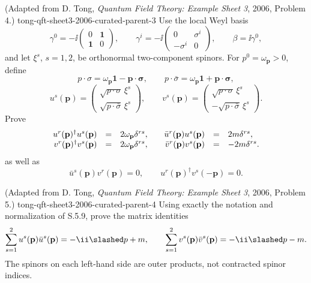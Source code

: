 \begin{enumerate}
  {(Adapted from D. Tong, \emph{Quantum Field Theory: Example Sheet 3}, 2006, Problem 4.)}
  {tong-qft-sheet3-2006-curated-parent-3}
Use the local Weyl basis
\[
 \gamma^0=-\ii\begin{pmatrix}0&\mathbf1\\ \mathbf1&0\end{pmatrix},
 \qquad
 \gamma^i=-\ii\begin{pmatrix}0&\sigma^i\\-\sigma^i&0\end{pmatrix},
 \qquad
 \beta=\ii\gamma^0,
\]
and let \(\xi^s\), \(s=1,2\), be orthonormal two-component spinors.
For \(p^0=\omega_{\mathbf p}>0\), define
\[
 p\cdot\sigma=\omega_{\mathbf p}\mathbf1-\mathbf p\cdot\boldsymbol\sigma,
 \qquad
 p\cdot\bar\sigma=\omega_{\mathbf p}\mathbf1+\mathbf p\cdot\boldsymbol\sigma,
\]
\[
 u^s(\mathbf p)=
 \begin{pmatrix}\sqrt{p\cdot\sigma}\,\xi^s\\
 \sqrt{p\cdot\bar\sigma}\,\xi^s\end{pmatrix},
 \qquad
 v^s(\mathbf p)=
 \begin{pmatrix}\sqrt{p\cdot\sigma}\,\xi^s\\
 -\sqrt{p\cdot\bar\sigma}\,\xi^s\end{pmatrix}.
\]
Prove
\[
\begin{array}{rcl@{\qquad}rcl}
u^r(\mathbf p)^\dagger u^s(\mathbf p)&=&2\omega_{\mathbf p}\delta^{rs},
&\bar u^r(\mathbf p)u^s(\mathbf p)&=&2m\delta^{rs},\\
v^r(\mathbf p)^\dagger v^s(\mathbf p)&=&2\omega_{\mathbf p}\delta^{rs},
&\bar v^r(\mathbf p)v^s(\mathbf p)&=&-2m\delta^{rs}.
\end{array}
\]
as well as
\[
 \bar u^s(\mathbf p)v^r(\mathbf p)=0,\qquad
 u^r(\mathbf p)^\dagger v^s(-\mathbf p)=0.
\]

  {(Adapted from D. Tong, \emph{Quantum Field Theory: Example Sheet 3}, 2006, Problem 5.)}
  {tong-qft-sheet3-2006-curated-parent-4}
Using exactly the notation and normalization of S.5.9, prove the
matrix identities
\[
 \sum_{s=1}^2u^s(\mathbf p)\bar u^s(\mathbf p)
 =-\ii\slashed p+m,
 \qquad
 \sum_{s=1}^2v^s(\mathbf p)\bar v^s(\mathbf p)
 =-\ii\slashed p-m.
\]
The spinors on each left-hand side are outer products, not contracted
spinor indices.


\end{enumerate}
